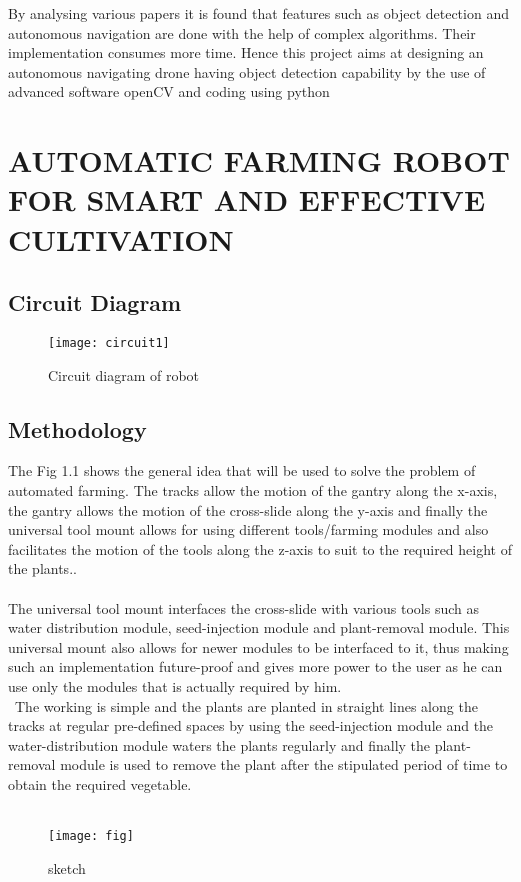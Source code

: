 \documentclass[12pt,a4paper]{report}
\begin{document}
\hspace*{1cm} By analysing various papers it is found that features such as object detection and autonomous navigation are done with the help of complex algorithms. Their implementation consumes more time.  Hence this project aims at designing an autonomous navigating drone having object detection capability by the use of advanced  software openCV and coding using python

\chapter{AUTOMATIC FARMING ROBOT FOR SMART AND EFFECTIVE CULTIVATION }

\section{Circuit Diagram}
\begin{figure}[h!]
\centering
\texttt{[image: circuit1]}
\caption{Circuit diagram of robot}
\label{circuit}
\end{figure}

\section{Methodology}


\hspace*{1cm}             The Fig 1.1 shows the general idea that will be used to solve the problem of automated farming. The tracks allow the motion of the gantry along the x-axis, the gantry allows the motion of the cross-slide along the y-axis and finally the universal tool mount allows for using different tools/farming modules and also facilitates the motion of the tools along the z-axis to suit to the required height of the plants..\\\\
\hspace*{1cm} The universal tool mount interfaces the cross-slide with various tools such as water distribution module, seed-injection module and plant-removal module. This universal mount also allows for newer modules to be interfaced to it, thus making such an implementation future-proof and gives more power to the user as he can use only the modules that is actually required by him. \\\
\hspace*{1cm}The working is simple and the plants are planted in straight lines along the tracks at regular pre-defined spaces by using the seed-injection module and the water-distribution module waters the plants regularly and finally the plant-removal module is used to remove the plant after the stipulated period of time to obtain the required vegetable.\\\
\begin{figure}[h!]
\centering
\texttt{[image: fig]}
\caption{sketch}
\label{circuit}
\end{figure}
\end{document}
